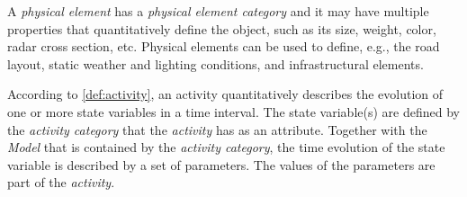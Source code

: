 \cstartb A \textit{physical element} has a \textit{physical element category} and it may have multiple properties that quantitatively define the object, such as its \cendb size, weight, color, radar cross section, etc.  \cendb Physical elements can be used to define, e.g., the road layout, static weather and lighting conditions, and infrastructural elements.

According to \cref{def:activity}, an activity quantitatively describes the evolution of one or more state variables in a time interval. The state variable(s) are defined by the \textit{activity category} that the \textit{activity} has as an attribute. Together with the \textit{Model} that is contained by the \textit{activity category}, the time evolution of the state variable is described by a set of parameters. The values of the parameters are part of the \textit{activity}. 


